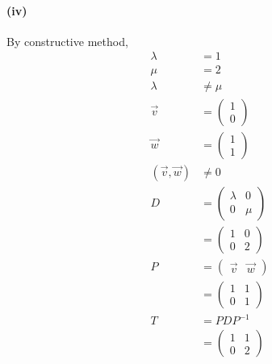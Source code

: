 \paragraph{(iv)}
By constructive method,
\begin{align*}
	\lambda            & = 1                 \\
	\mu                & = 2                 \\
	\lambda            & \ne \mu             \\
	\vec{v}            & = \begin{pmatrix}
		                       1 \\
		                       0
	                       \end{pmatrix}    \\
	\vec{w}            & = \begin{pmatrix}
		                       1 \\
		                       1
	                       \end{pmatrix}    \\
	(\vec{v}, \vec{w}) & \ne 0               \\
	D                  & = \begin{pmatrix}
		                       \lambda & 0   \\
		                       0       & \mu
	                       \end{pmatrix}    \\
	                   & = \begin{pmatrix}
		                       1 & 0 \\
		                       0 & 2
	                       \end{pmatrix}    \\
	P                  & = \begin{pmatrix}
		                       \vec{v} & \vec{w}
	                       \end{pmatrix} \\
	                   & = \begin{pmatrix}
		                       1 & 1 \\
		                       0 & 1
	                       \end{pmatrix}    \\
	T                  & = PDP^{-1}          \\
	                   & = \begin{pmatrix}
		                       1 & 1 \\
		                       0 & 2
	                       \end{pmatrix}
\end{align*}
